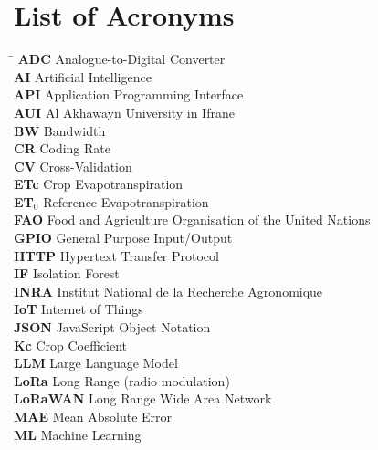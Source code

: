 \documentclass[12pt,a4paper]{report}
\begin{document}
\tableofcontents
\listoffigures
\listoftables

\chapter*{List of Acronyms}
\begin{tabbing}
  \hspace{3.5cm}\=\kill
  \textbf{ADC}   \> Analogue-to-Digital Converter \\
  \textbf{AI}    \> Artificial Intelligence \\
  \textbf{API}   \> Application Programming Interface \\
  \textbf{AUI}   \> Al Akhawayn University in Ifrane \\
  \textbf{BW}    \> Bandwidth \\
  \textbf{CR}    \> Coding Rate \\
  \textbf{CV}    \> Cross-Validation \\
  \textbf{ETc}   \> Crop Evapotranspiration \\
  \textbf{ET$_0$}\> Reference Evapotranspiration \\
  \textbf{FAO}   \> Food and Agriculture Organisation of the United Nations \\
  \textbf{GPIO}  \> General Purpose Input/Output \\
  \textbf{HTTP}  \> Hypertext Transfer Protocol \\
  \textbf{IF}    \> Isolation Forest \\
  \textbf{INRA}  \> Institut National de la Recherche Agronomique \\
  \textbf{IoT}   \> Internet of Things \\
  \textbf{JSON}  \> JavaScript Object Notation \\
  \textbf{Kc}    \> Crop Coefficient \\
  \textbf{LLM}   \> Large Language Model \\
  \textbf{LoRa}  \> Long Range (radio modulation) \\
  \textbf{LoRaWAN}\> Long Range Wide Area Network \\
  \textbf{MAE}   \> Mean Absolute Error \\
  \textbf{ML}    \> Machine Learning \\

\end{tabbing}
\end{document}
